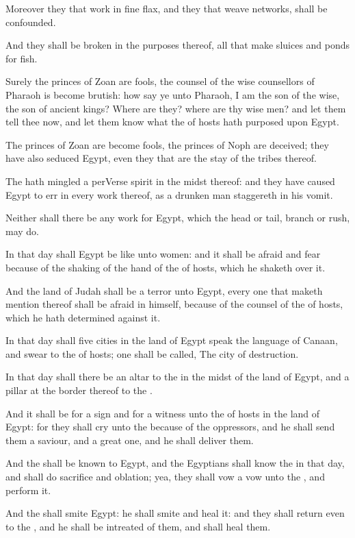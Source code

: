 \Verse Moreover they that work in fine flax, and they that weave networks, shall be confounded.

\Verse And they shall be broken in the purposes thereof, all that make sluices and ponds for fish.

\Verse Surely the princes of Zoan are fools, the counsel of the wise counsellors of Pharaoh is become brutish: how say ye unto Pharaoh, I am the son of the wise, the son of ancient kings?  \Verse Where are they? where are thy wise men? and let them tell thee now, and let them know what the \LORD of hosts hath purposed upon Egypt.

\Verse The princes of Zoan are become fools, the princes of Noph are deceived; they have also seduced Egypt, even they that are the stay of the tribes thereof.

\Verse The \LORD hath mingled a perVerse spirit in the midst thereof: and they have caused Egypt to err in every work thereof, as a drunken man staggereth in his vomit.

\Verse Neither shall there be any work for Egypt, which the head or tail, branch or rush, may do.

\Verse In that day shall Egypt be like unto women: and it shall be afraid and fear because of the shaking of the hand of the \LORD of hosts, which he shaketh over it.

\Verse And the land of Judah shall be a terror unto Egypt, every one that maketh mention thereof shall be afraid in himself, because of the counsel of the \LORD of hosts, which he hath determined against it.

\Verse In that day shall five cities in the land of Egypt speak the language of Canaan, and swear to the \LORD of hosts; one shall be called, The city of destruction.

\Verse In that day shall there be an altar to the \LORD in the midst of the land of Egypt, and a pillar at the border thereof to the \LORD.

\Verse And it shall be for a sign and for a witness unto the \LORD of hosts in the land of Egypt: for they shall cry unto the \LORD because of the oppressors, and he shall send them a saviour, and a great one, and he shall deliver them.

\Verse And the \LORD shall be known to Egypt, and the Egyptians shall know the \LORD in that day, and shall do sacrifice and oblation; yea, they shall vow a vow unto the \LORD, and perform it.

\Verse And the \LORD shall smite Egypt: he shall smite and heal it: and they shall return even to the \LORD, and he shall be intreated of them, and shall heal them.


